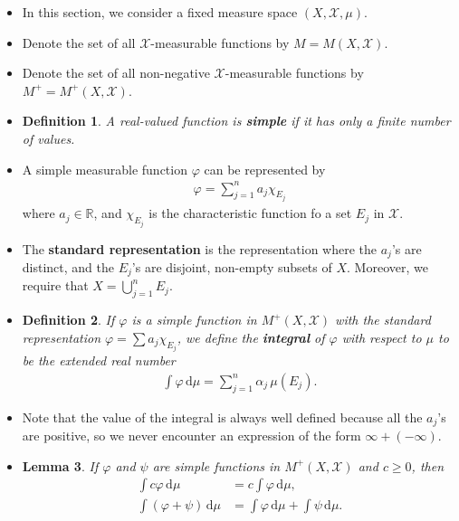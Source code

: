 \documentclass[10pt]{article}
\newtheorem{lemma}{Lemma}
\newtheorem{definition}[lemma]{Definition}
\newcommand{\dee}{\mathrm{d}}
\newcommand{\mcal}[1]{\mathcal{#1}}
\newcommand{\Real}{\mathbb{R}}
\begin{document}
\begin{itemize}
  \item In this section, we consider a fixed measure space $(X, \mcal{X}, \mu)$.
  
  \item Denote the set of all $\mcal{X}$-measurable functions by $M = M(X,\mcal{X})$.
  
  \item Denote the set of all non-negative $\mcal{X}$-measurable functions by $M^+ = M^+(X,\mcal{X})$.
  
  \item \begin{definition}
    A real-valued function is {\bf simple} if it has only a finite number of values.
  \end{definition}

  \item A simple measurable function $\varphi$ can be represented by
  \begin{align*}
    \varphi = \sum_{j=1}^n a_j \chi_{E_j}
  \end{align*}
  where $a_j \in \Real$, and $\chi_{E_j}$ is the characteristic function fo a set $E_j$ in $\mcal{X}$.

  \item The {\bf standard representation} is the representation where the $a_j$'s are distinct, and the $E_j$'s are disjoint, non-empty subsets of $X$. Moreover, we require that $X = \bigcup_{j=1}^n E_j$.

  \item \begin{definition}
    If $\varphi$ is a simple function in $M^+(X,\mcal{X})$ with the standard representation $\varphi = \sum a_j \chi_{E_j}$, we define the {\bf integral} of $\varphi$ with respect to $\mu$ to be the extended real number
    \begin{align*}
      \int \varphi\, \dee\mu = \sum_{j=1}^n \alpha_j\, \mu(E_j).
    \end{align*}
  \end{definition}  

  \item Note that the value of the integral is always well defined because all the $a_j$'s are positive, so we never encounter an expression of the form $\infty + (-\infty)$.
  
  \item \begin{lemma}
    If $\varphi$ and $\psi$ are simple functions in $M^+(X,\mcal{X})$ and $c \geq 0$, then
    \begin{align*}
      \int c\varphi\, \dee\mu &= c \int \varphi\, \dee\mu, \\
      \int (\varphi + \psi) \, \dee\mu &= \int \varphi\, \dee\mu + \int \psi\, \dee\mu.
    \end{align*}
  \end{lemma}


\end{itemize}
\end{document}
